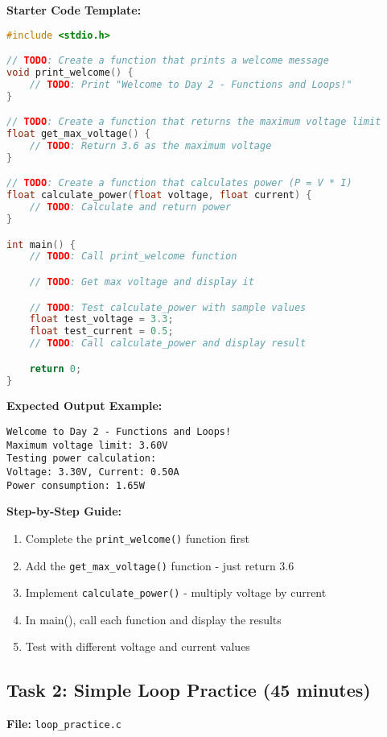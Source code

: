 \documentclass[11pt,a4paper]{article}
\begin{document}
\textbf{Starter Code Template:}
\begin{lstlisting}[language=C]
#include <stdio.h>

// TODO: Create a function that prints a welcome message
void print_welcome() {
    // TODO: Print "Welcome to Day 2 - Functions and Loops!"
}

// TODO: Create a function that returns the maximum voltage limit
float get_max_voltage() {
    // TODO: Return 3.6 as the maximum voltage
}

// TODO: Create a function that calculates power (P = V * I)
float calculate_power(float voltage, float current) {
    // TODO: Calculate and return power
}

int main() {
    // TODO: Call print_welcome function

    // TODO: Get max voltage and display it

    // TODO: Test calculate_power with sample values
    float test_voltage = 3.3;
    float test_current = 0.5;
    // TODO: Call calculate_power and display result

    return 0;
}
\end{lstlisting}

\textbf{Expected Output Example:}
\begin{verbatim}
Welcome to Day 2 - Functions and Loops!
Maximum voltage limit: 3.60V
Testing power calculation:
Voltage: 3.30V, Current: 0.50A
Power consumption: 1.65W
\end{verbatim}

\textbf{Step-by-Step Guide:}
\begin{enumerate}
    \item Complete the \texttt{print\_welcome()} function first
    \item Add the \texttt{get\_max\_voltage()} function - just return 3.6
    \item Implement \texttt{calculate\_power()} - multiply voltage by current
    \item In main(), call each function and display the results
    \item Test with different voltage and current values
\end{enumerate}

\subsection{Task 2: Simple Loop Practice (45 minutes)}

\textbf{File:} \texttt{loop\_practice.c}
\end{document}
